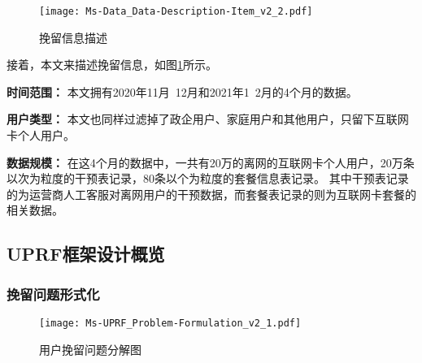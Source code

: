 \begin{figure}[hbt]
	\centering
	\texttt{[image: Ms-Data\_Data-Description-Item\_v2\_2.pdf]}
	\caption{挽留信息描述}
	\label{Fig:Item-Side-Data}
\end{figure}
接着，本文来描述挽留信息，如图\ref{Fig:Item-Side-Data}所示。\par
\textbf{时间范围：} 本文拥有2020年11月~12月和2021年1~2月的4个月的数据。\par
\textbf{用户类型：} 本文也同样过滤掉了政企用户、家庭用户和其他用户，只留下互联网卡个人用户。\par
\textbf{数据规模：} 在这4个月的数据中，一共有20万的离网的互联网卡个人用户，20万条以次为粒度的干预表记录，80条以个为粒度的套餐信息表记录。
其中干预表记录的为运营商人工客服对离网用户的干预数据，而套餐表记录的则为互联网卡套餐的相关数据。\par

\subsection{UPRF框架设计概览}
\subsubsection{挽留问题形式化}
\begin{figure}[!hbt]
	\centering
	\texttt{[image: Ms-UPRF\_Problem-Formulation\_v2\_1.pdf]}
	\caption{用户挽留问题分解图}
	\label{Fig:Retention-Problem}
\end{figure}

